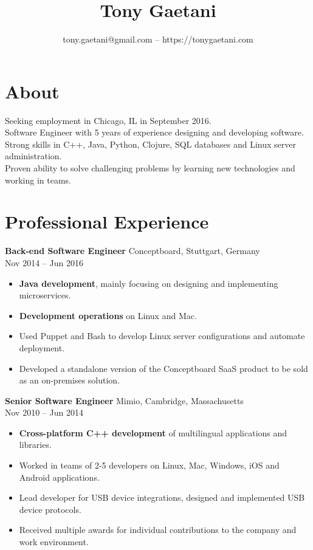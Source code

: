 \documentclass{article}
\title{\bfseries\Large Tony Gaetani}
\author{tony.gaetani@gmail.com -- https://tonygaetani.com}
\date{}
\begin{document}
\maketitle

\section*{About}
Seeking employment in Chicago, IL in September 2016.\\
Software Engineer with 5 years of experience designing and developing software.\\
Strong skills in C++, Java, Python, Clojure, SQL databases and Linux server administration.\\
Proven ability to solve challenging problems by learning new technologies and working in teams.\\
\section*{Professional Experience}
{\bf Back-end Software Engineer} Conceptboard, Stuttgart, Germany\\
Nov 2014 -- Jun 2016
\begin{itemize}
  \itemsep0em
  \item {\bf Java development}, mainly focusing on designing and implementing microservices.
  \item {\bf Development operations} on Linux and Mac.
  \item Used Puppet and Bash to develop Linux server configurations and automate deployment.
  \item Developed a standalone version of the Conceptboard SaaS product to be sold as an on-premises solution.\\
\end{itemize}
{\bf Senior Software Engineer} Mimio, Cambridge, Massachusetts\\
Nov 2010 -- Jun 2014
\begin{itemize}
  \itemsep0em
  \item {\bf Cross-platform C++ development} of multilingual applications and libraries.
  \item Worked in teams of 2-5 developers on Linux, Mac, Windows, iOS and Android applications.
  \item Lead developer for USB device integrations, designed and implemented USB device protocols.
  \item Received multiple awards for individual contributions to the company and work environment.\\
\end{itemize}
\end{document}
